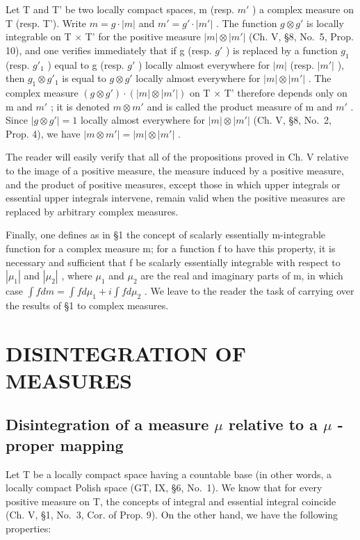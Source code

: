 Let T and T' be two locally compact spaces, m (resp. \(m'\) ) a complex measure on T (resp. T'). Write \(m = g \cdot |m|\) and \(m' = g' \cdot |m'|\) . The function \(g \otimes g'\) is locally integrable on T × T' for the positive measure \(|m| \otimes |m'|\) (Ch. V, §8, No.~5, Prop. 10), and one verifies immediately that if g (resp. \(g'\) ) is replaced by a function \(g_1\) (resp. \(g'_1\) ) equal to g (resp. \(g'\) ) locally almost everywhere for \(|m|\) (resp. \(|m'|\) ), then \(g_1 \otimes g'_1\) is equal to \(g \otimes g'\) locally almost everywhere for \(|m| \otimes |m'|\) . The complex measure \((g \otimes g') \cdot (|m| \otimes |m'|)\) on T × T' therefore depends only on m and \(m'\) ; it is denoted \(m \otimes m'\) and is called the product measure of m and \(m'\) . Since \(|g \otimes g'| = 1\) locally almost everywhere for \(|m| \otimes |m'|\) (Ch. V, §8, No.~2, Prop. 4), we have \(|m \otimes m'| = |m| \otimes |m'|\) .

The reader will easily verify that all of the propositions proved in Ch. V relative to the image of a positive measure, the measure induced by a positive measure, and the product of positive measures, except those in which upper integrals or essential upper integrals intervene, remain valid when the positive measures are replaced by arbitrary complex measures.

Finally, one defines as in §1 the concept of scalarly essentially m-integrable function for a complex measure m; for a function f to have this property, it is necessary and sufficient that f be scalarly essentially integrable with respect to \(|\mu_{1}|\) and \(|\mu_{2}|\) , where \(\mu_{1}\) and \(\mu_{2}\) are the real and imaginary parts of m, in which case \(\int f dm = \int f d\mu_{1} + i \int f d\mu_{2}\) . We leave to the reader the task of carrying over the results of §1 to complex measures.

\section{DISINTEGRATION OF MEASURES}

\subsection{\texorpdfstring{Disintegration of a measure \(\mu\) relative to a \(\mu\) -proper mapping}{Disintegration of a measure mu relative to a mu -proper mapping}}

Let T be a locally compact space having a countable base (in other words, a locally compact Polish space (GT, IX, §6, No.~1). We know that for every positive measure on T, the concepts of integral and essential integral coincide (Ch. V, §1, No.~3, Cor. of Prop. 9). On the other hand, we have the following properties:

